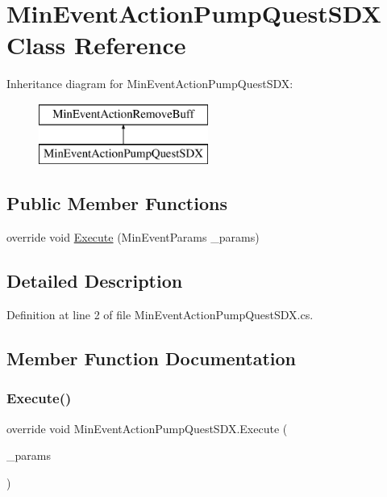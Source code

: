 \hypertarget{class_min_event_action_pump_quest_s_d_x}{}\section{Min\+Event\+Action\+Pump\+Quest\+S\+DX Class Reference}
\label{class_min_event_action_pump_quest_s_d_x}
Inheritance diagram for Min\+Event\+Action\+Pump\+Quest\+S\+DX\+:\begin{figure}[H]
\begin{center}
\leavevmode
\includegraphics[height=2.000000cm]{d9/d25/class_min_event_action_pump_quest_s_d_x}
\end{center}
\end{figure}
\subsection*{Public Member Functions}
\begin{DoxyCompactItemize}
\item 
override void \mbox{\hyperlink{class_min_event_action_pump_quest_s_d_x_a7fd2a6299222d8641d67f0152877e89c}{Execute}} (Min\+Event\+Params \+\_\+params)
\end{DoxyCompactItemize}


\subsection{Detailed Description}


Definition at line 2 of file Min\+Event\+Action\+Pump\+Quest\+S\+D\+X.\+cs.



\subsection{Member Function Documentation}
\mbox{\label{class_min_event_action_pump_quest_s_d_x_a7fd2a6299222d8641d67f0152877e89c}} 
\subsubsection{\texorpdfstring{Execute()}{Execute()}}
{\footnotesize\ttfamily override void Min\+Event\+Action\+Pump\+Quest\+S\+D\+X.\+Execute (\begin{DoxyParamCaption}\item[{Min\+Event\+Params}]{\+\_\+params }\end{DoxyParamCaption})}



